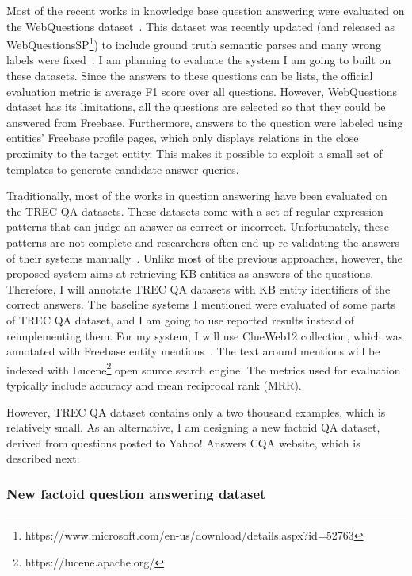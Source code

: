 Most of the recent works in knowledge base question answering were evaluated on the WebQuestions dataset~\cite{BerantCFL13:sempre}.
This dataset was recently updated (and released as WebQuestionsSP\footnote{https://www.microsoft.com/en-us/download/details.aspx?id=52763}) to include ground truth semantic parses and many wrong labels were fixed~\cite{yih2016webquestionssp}.
I am planning to evaluate the system I am going to built on these datasets.
Since the answers to these questions can be lists, the official evaluation metric is average F1 score over all questions.
However, WebQuestions dataset has its limitations, \eg all the questions are selected so that they could be answered from Freebase.
Furthermore, answers to the question were labeled using entities' Freebase profile pages, which only displays relations in the close proximity to the target entity.
This makes it possible to exploit a small set of templates to generate candidate answer queries.

Traditionally, most of the works in question answering have been evaluated on the TREC QA datasets.
These datasets come with a set of regular expression patterns that can judge an answer as correct or incorrect.
Unfortunately, these patterns are not complete and researchers often end up re-validating the answers of their systems manually~\cite{Sun:2015:ODQ:2736277.2741651,tsai2015web}.
Unlike most of the previous approaches, however, the proposed system aims at retrieving KB entities as answers of the questions.
Therefore, I will annotate TREC QA datasets with KB entity identifiers of the correct answers.
The baseline systems I mentioned were evaluated of some parts of TREC QA dataset, and I am going to use reported results instead of reimplementing them.
For my system, I will use ClueWeb12 collection, which was annotated with Freebase entity mentions~\cite{gabrilovich2013facc1}.
The text around mentions will be indexed with Lucene\footnote{https://lucene.apache.org/} open source search engine.
The metrics used for evaluation typically include accuracy and mean reciprocal rank (MRR).

However, TREC QA dataset contains only a two thousand examples, which is relatively small.
As an alternative, I am designing a new factoid QA dataset, derived from questions posted to Yahoo! Answers CQA website, which is described next.


\subsubsection{New factoid question answering dataset}
\label{section:factoid:proposal:experiments:dataset}

